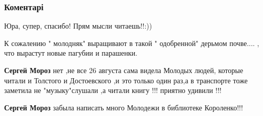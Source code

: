  
 
 
 
 
\subsubsection{Коментарі}

\begin{itemize}
 
Юра, супер, спасибо! Прям мысли читаешь!!:))

 
К сожалению " молодняк" выращивают в такой " одобренной" дерьмом почве.... , что вырастут новые пагубии и парашенки.

\begin{itemize}
 
\textbf{Сергей Мороз} нет ,не все 26 августа сама видела Молодых людей, которые читали и Толстого и Достоевского ,и это только один раз,а в транспорте тоже заметила не "музыку"слушали ,а читали книгу !!! приятно удивили !!!

 
\textbf{Сергей Мороз} забыла написать много Молодежи в библиотеке Короленко!!!


\end{itemize}
\end{itemize}
